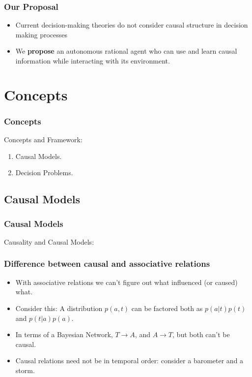 \documentclass{beamer}
\theoremstyle{plain}
\begin{document}
\begin{frame}
\frametitle{Our Proposal}
\begin{itemize}
\item Current decision-making theories do not consider causal structure in decision making processes
\item We \textbf{propose} an autonomous rational agent who can use and learn causal information while interacting with its environment.
\end{itemize}
\end{frame}

\section{Concepts}
\begin{frame}
\frametitle{Concepts}
Concepts and Framework:
\begin{enumerate}
\item Causal Models.
\item Decision Problems.
\end{enumerate}
\end{frame}

\subsection{Causal Models}
		\begin{frame}
		\frametitle{Causal Models}
		Causality and Causal Models:
		\end{frame}
		\begin{frame}
		\frametitle{Difference between causal and associative relations}
		\begin{itemize}
		\item With associative relations we can't figure out what influenced (or caused) what.
		\item Consider this: A distribution $p(a,t)$ can be factored both as $p(a|t)p(t)$ and $p(t|a)p(a)$. 
		\item In terms of a Bayesian Network, $T \to A$, and $A \to T$, but both can't be causal.
		\item Causal relations need not be in temporal order: consider a barometer and a storm.
		\end{itemize}
		\end{frame}
		
\end{document}
